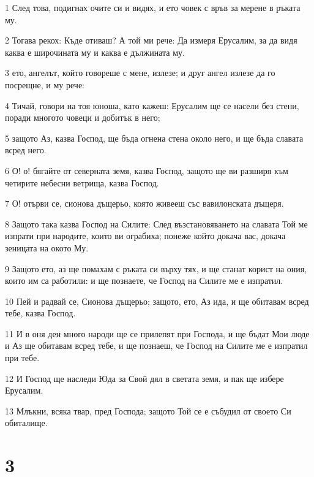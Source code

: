 \par 1 След това, подигнах очите си и видях, и ето човек с връв за мерене в ръката му.
\par 2 Тогава рекох: Къде отиваш? А той ми рече: Да измеря Ерусалим, за да видя каква е широчината му и каква е дължината му.
\par 3 ето, ангелът, който говореше с мене, излезе; и друг ангел излезе да го посрещне, и му рече:
\par 4 Тичай, говори на тоя юноша, като кажеш: Ерусалим ще се насели без стени, поради многото човеци и добитък в него;
\par 5 защото Аз, казва Господ, ще бъда огнена стена около него, и ще бъда славата всред него.
\par 6 О! о! бягайте от северната земя, казва Господ, защото ще ви разширя към четирите небесни ветрища, казва Господ.
\par 7 О! отърви се, сионова дъщерьо, която живееш със вавилонската дъщеря.
\par 8 Защото така казва Господ на Силите: След възстановяването на славата Той ме изпрати при народите, които ви ограбиха; понеже който докача вас, докача зеницата на окото Му.
\par 9 Защото ето, аз ще помахам с ръката си върху тях, и ще станат корист на ония, които им са работили: и ще познаете, че Господ на Силите ме е изпратил.
\par 10 Пей и радвай се, Сионова дъщерьо; защото, ето, Аз ида, и ще обитавам всред тебе, казва Господ.
\par 11 И в оня ден много народи ще се прилепят при Господа, и ще бъдат Мои люде и Аз ще обитавам всред тебе, и ще познаеш, че Господ на Силите ме е изпратил при тебе.
\par 12 И Господ ще наследи Юда за Свой дял в светата земя, и пак ще избере Ерусалим.
\par 13 Млъкни, всяка твар, пред Господа; защото Той се е събудил от своето Си обиталище.

\chapter{3}

